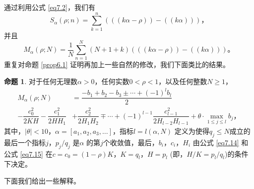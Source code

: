 \documentclass[11pt,a4paper]{article}
\theoremstyle{definition}
\newtheorem{prop}{\textbf{命题}}[section]
\newcommand{\refeq}[1]{公式 \ref{#1}}
\newcommand{\refprop}[1]{命题 \ref{#1}}
\numberwithin{equation}{section}
\newcommand{\comma}{\text{，}}
\newcommand{\juhao}{\text{。}}
\newcommand{\conalpha}{$ \alpha=\left[a_{1},a_{2},a_{3},\ldots\right] $}
\newcommand{\myone}[1]{\left(-1\right)^{#1}}
\newcommand{\QEDopen}{{\setlength{\fboxsep}{0pt}\setlength{\fboxrule}{0.2pt}\fbox{\rule[0pt]{0pt}{1.3ex}\rule[0pt]{1.3ex}{0pt}}}}
\newcommand{\ddbrace}[1]{\left(\left(#1\right)\right)}
\begin{document}
通过利用\refeq{eq7.2}，我们有
\[ S_{\alpha}\left(\rho;n\right)=\sum_{k=1}^{n}\left(\ddbrace{k\alpha-\rho}-\ddbrace{k\alpha}\right)\comma \]
并且
\[ M_{\alpha}\left(\rho; N\right)=\dfrac{1}{N}\sum_{n=1}^{N}\left(N+1+k\right)\left(\ddbrace{k\alpha-\rho}-\ddbrace{k\alpha}\right)\juhao \] 
重复对\refprop{prop6.1} 证明再加上一些自然的修改，我们下面类比的结果。

\begin{prop}\label{prop7.1}
	对于任何无理数$ \alpha>0 $，任何实数$ 0<\rho<1 $，以及任何整数$ N\geq1 $，
	\begin{equation}\label{eq7.21}
	\begin{split}
	M_{\alpha}\left(\rho; N\right)&=\dfrac{-b_{1}+b_{2}-b_{3}\pm\cdots+\myone{l}b_{l}}{2}
	\\-\dfrac{c_{0}^{2}}{2KH}-\dfrac{c_{1}^{2}}{2HH_{1}}&+\dfrac{c_{2}^{2}}{2H_{1}H_{2}}\mp\cdots+\myone{l-1}\dfrac{c_{l-1}^{2}}{2H_{l-2}H_{l-1}}+\theta\cdot\underset{1\leq j\leq l}{\max}b_{j}\comma
	\end{split}
	\end{equation}
	其中，$ \lvert\theta\rvert<10  $，\conalpha，指标$ l=l\left(\alpha,N\right) $ 定义为使得$ q_{j}\leq N $成立的最后一个指标$ j $，$ p_{j}/q_{j} $ 是$ \alpha $ 的第$ j $个收敛值，最后，$ b_{i}\comma c_{i}\comma H_{i} $ 由\refeq{eq7.14} 和\refeq{eq7.15} 在$ c=c_{0}=\left(1-\rho\right)K\comma K=q_{l}\comma H=p_{l} $ (即，$ H/K=p_{l}/q_{l} $)的条件下决定。 \hfill\QEDopen
\end{prop}

下面我们给出一些解释。
\end{document}
